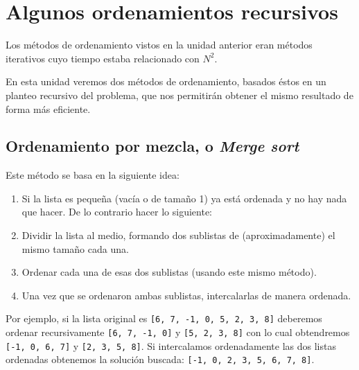
%

\chapter{Algunos ordenamientos recursivos}

Los métodos de ordenamiento vistos en la unidad anterior eran métodos
iterativos cuyo tiempo estaba relacionado con $N^2$.

En esta unidad veremos dos métodos de ordenamiento, basados
éstos en un planteo recursivo del problema, que nos permitirán obtener el
mismo resultado de forma más eficiente.

\section{Ordenamiento por mezcla, o {\it Merge sort} }

Este método se basa en la siguiente idea:
\begin{enumerate}
\item Si la lista es pequeña (vacía o de tamaño 1) ya está ordenada y
no hay nada que hacer. De lo contrario hacer lo siguiente:
\item Dividir la lista al medio, formando dos sublistas de (aproximadamente) el
mismo tamaño cada una.
\item Ordenar cada una de esas dos sublistas (usando
este mismo método).
\item Una vez que se ordenaron ambas sublistas, intercalarlas de manera ordenada.
\end{enumerate}

Por ejemplo, si la lista original es \lstinline+[6, 7, -1, 0, 5, 2, 3, 8]+
deberemos ordenar recursivamente \lstinline+[6, 7, -1, 0]+ y
\lstinline+[5, 2, 3, 8]+ con lo cual obtendremos \lstinline+[-1, 0, 6, 7]+ y
\lstinline+[2, 3, 5, 8]+.  Si intercalamos ordenadamente las dos listas
ordenadas obtenemos la solución buscada:
\lstinline+[-1, 0, 2, 3, 5, 6, 7, 8]+.

